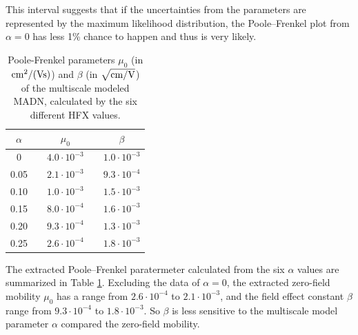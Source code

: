 \documentclass[%
 reprint,
superscriptaddress,
 amsmath,amssymb,
 aps,
prb,
floatfix
]{revtex4-2}
\newcommand{\bjoern}[2]{{\color{blue}{{\bf #1} #2}}}
\begin{document}


This interval suggests that if the uncertainties from the parameters are represented by the maximum likelihood distribution, the Poole–Frenkel plot from $\alpha=0$ has less 1\% chance to happen and thus is very likely. 


\begin{table}[tbp]%
  \caption{\label{tab:PF_parameter}%
  Poole-Frenkel parameters $\mu_0$ (in $\unit[]{cm^2/(Vs)}$) and $\beta$ (in $\unit[]{\sqrt{cm/V}}$) of the multiscale modeled MADN, calculated by the six different HFX values. 
  }
  \begin{ruledtabular}
    \begin{tabular}{c c c c c}
    $\alpha$ & & $\mu_0$  & & $\beta$ \\
      \hline
    0 & & $4.0 \cdot 10^{-3}$ & & $1.0 \cdot 10^{-3}$ \\
    0.05 & & $2.1 \cdot 10^{-3}$ & & $9.3 \cdot 10^{-4}$ \\
    0.10 & & $1.0 \cdot 10^{-3}$ & & $1.5 \cdot 10^{-3}$ \\
    0.15 & & $8.0 \cdot 10^{-4}$ & & $1.6 \cdot 10^{-3}$ \\
    0.20 & & $9.3 \cdot 10^{-4}$ & & $1.3 \cdot 10^{-3}$ \\
    0.25 & & $2.6 \cdot 10^{-4}$ & & $1.8 \cdot 10^{-3}$ \\
      \end{tabular}
  \end{ruledtabular}
  \end{table}

The extracted Poole–Frenkel paratermeter calculated from the six $\alpha$ values are summarized in Table \ref{tab:PF_parameter}. 
Excluding the data of $\alpha=0$, the extracted zero-field mobility $\mu_0$ has a range from $2.6 \cdot 10^{-4}$ to $2.1 \cdot 10^{-3}$, and the field effect constant $\beta$ range from $9.3 \cdot 10^{-4}$ to $1.8 \cdot 10^{-3}$.
So $\beta$ is less sensitive to the multiscale model parameter $\alpha$ compared the zero-field mobility.


\end{document}
